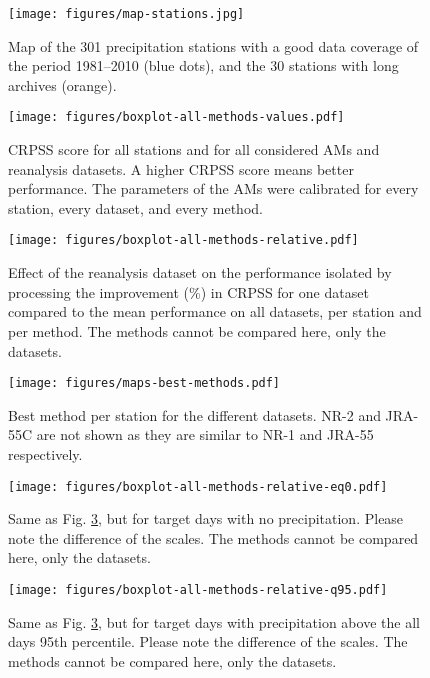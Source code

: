 \documentclass{ametsoc}
\begin{document}
\begin{figure}[t]
  \noindent\texttt{[image: figures/map-stations.jpg]}\\
  \caption{Map of the 301 precipitation stations with a good data coverage of the period 1981--2010 (blue dots), and the 30 stations with long archives (orange).}
	\label{fig:stations}
\end{figure}

\begin{figure}[t]
	\noindent\texttt{[image: figures/boxplot-all-methods-values.pdf]}\\
	\caption{CRPSS score for all stations and for all considered AMs and reanalysis datasets. A higher CRPSS score means better performance. The parameters of the AMs were calibrated for every station, every dataset, and every method.}
	\label{fig:comparison_values}
\end{figure}

\begin{figure}[t]
	\noindent\texttt{[image: figures/boxplot-all-methods-relative.pdf]}\\
	\caption{Effect of the reanalysis dataset on the performance isolated by processing the improvement (\%) in CRPSS for one dataset compared to the mean performance on all datasets, per station and per method. The methods cannot be compared here, only the datasets.}
	\label{fig:comparison_relative}
\end{figure}

\begin{figure}[t]
	\noindent\texttt{[image: figures/maps-best-methods.pdf]}\\
	\caption{Best method per station for the different datasets. NR-2 and JRA-55C are not shown as they are similar to NR-1 and JRA-55 respectively.}
	\label{fig:map_best_methods}
\end{figure}

\begin{figure}[t]
	\noindent\texttt{[image: figures/boxplot-all-methods-relative-eq0.pdf]}\\
	\caption{Same as Fig. \ref{fig:comparison_relative}, but for target days with no precipitation. Please note the difference of the scales. The methods cannot be compared here, only the datasets.}
	\label{fig:comparison_relative_P0}
\end{figure}

\begin{figure}[t]
	\noindent\texttt{[image: figures/boxplot-all-methods-relative-q95.pdf]}\\
	\caption{Same as Fig. \ref{fig:comparison_relative}, but for target days with precipitation above the all days 95th percentile. Please note the difference of the scales. The methods cannot be compared here, only the datasets.}
	\label{fig:comparison_relative_Pq95}
\end{figure}
\end{document}
